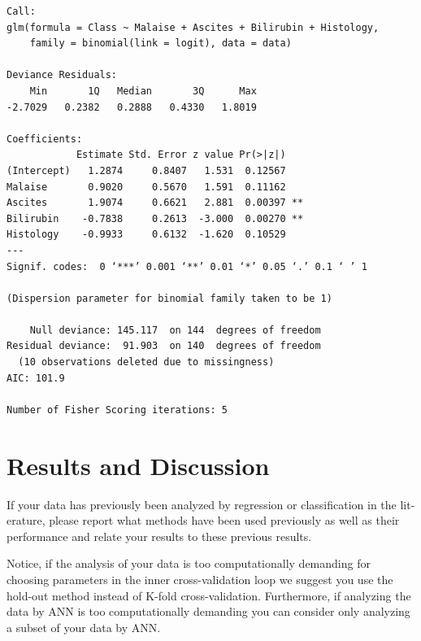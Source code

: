\documentclass[10pt, paper=a4]{article}
\begin{document}
\begin{lstlisting}[label = lst:logistic_regression, caption = {Results of logistic regression}]
  Call:
glm(formula = Class ~ Malaise + Ascites + Bilirubin + Histology, 
    family = binomial(link = logit), data = data)

Deviance Residuals: 
    Min       1Q   Median       3Q      Max  
-2.7029   0.2382   0.2888   0.4330   1.8019  

Coefficients:
            Estimate Std. Error z value Pr(>|z|)   
(Intercept)   1.2874     0.8407   1.531  0.12567   
Malaise       0.9020     0.5670   1.591  0.11162   
Ascites       1.9074     0.6621   2.881  0.00397 **
Bilirubin    -0.7838     0.2613  -3.000  0.00270 **
Histology    -0.9933     0.6132  -1.620  0.10529   
---
Signif. codes:  0 ‘***’ 0.001 ‘**’ 0.01 ‘*’ 0.05 ‘.’ 0.1 ‘ ’ 1

(Dispersion parameter for binomial family taken to be 1)

    Null deviance: 145.117  on 144  degrees of freedom
Residual deviance:  91.903  on 140  degrees of freedom
  (10 observations deleted due to missingness)
AIC: 101.9

Number of Fisher Scoring iterations: 5
\end{lstlisting}
\section{Results and Discussion}
\label{sec:results_and_discussion}
If your data has previously been analyzed by regression or
classification in the lit- erature, please report what methods have
been used previously as well as their performance and relate your
results to these previous results.

Notice, if the analysis of your data is too computationally demanding
for choosing parameters in the inner cross-validation loop we suggest
you use the hold-out method instead of K-fold
cross-validation. Furthermore, if analyzing the data by ANN is too
computationally demanding you can consider only analyzing a subset of
your data by ANN.
\end{document}
